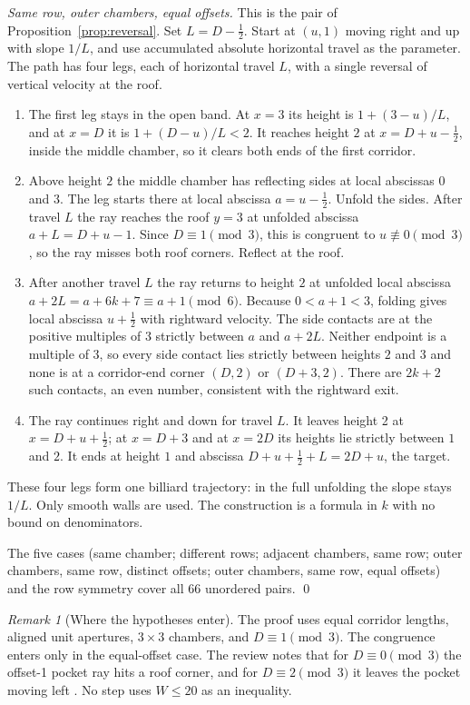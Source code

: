 \documentclass[11pt]{article}
\theoremstyle{definition}
\theoremstyle{remark}
\newtheorem{remark}{Remark}
\begin{document}
\emph{Same row, outer chambers, equal offsets.} This is the pair of
Proposition~\ref{prop:reversal}. Set $L=D-\tfrac12$. Start at $(u,1)$ moving
right and up with slope $1/L$, and use accumulated absolute horizontal travel as
the parameter. The path has four legs, each of horizontal travel $L$, with a
single reversal of vertical velocity at the roof.
\begin{enumerate}
\item The first leg stays in the open band. At $x=3$ its height is
$1+(3-u)/L$, and at $x=D$ it is $1+(D-u)/L<2$. It reaches height $2$ at
$x=D+u-\tfrac12$, inside the middle chamber, so it clears both ends of the first
corridor.
\item Above height $2$ the middle chamber has reflecting sides at local
abscissas $0$ and $3$. The leg starts there at local abscissa
$a=u-\tfrac12$. Unfold the sides. After travel $L$ the ray reaches the roof
$y=3$ at unfolded abscissa $a+L=D+u-1$. Since $D\equiv 1\pmod 3$, this is
congruent to $u\not\equiv 0\pmod 3$, so the ray misses both roof corners.
Reflect at the roof.
\item After another travel $L$ the ray returns to height $2$ at unfolded local
abscissa $a+2L=a+6k+7\equiv a+1\pmod 6$. Because $0<a+1<3$, folding gives local
abscissa $u+\tfrac12$ with rightward velocity. The side contacts are at the
positive multiples of $3$ strictly between $a$ and $a+2L$. Neither endpoint is a
multiple of $3$, so every side contact lies strictly between heights $2$ and
$3$ and none is at a corridor-end corner $(D,2)$ or $(D+3,2)$. There are
$2k+2$ such contacts, an even number, consistent with the rightward exit.
\item The ray continues right and down for travel $L$. It leaves height 2 at
$x=D+u+\tfrac12$; at $x=D+3$ and at $x=2D$ its heights lie strictly between $1$
and $2$. It ends at height $1$ and abscissa $D+u+\tfrac12+L=2D+u$, the target.
\end{enumerate}
These four legs form one billiard trajectory: in the full unfolding the slope
stays $1/L$. Only smooth walls are used. The construction is a formula in $k$
with no bound on denominators.

The five cases (same chamber; different rows; adjacent chambers, same row;
outer chambers, same row, distinct offsets; outer chambers, same row, equal
offsets) and the row symmetry cover all $66$ unordered pairs. \qed

\begin{remark}[Where the hypotheses enter]
The proof uses equal corridor lengths, aligned unit apertures, $3\times 3$
chambers, and $D\equiv 1\pmod 3$. The congruence enters only in the
equal-offset case. The review notes that for $D\equiv 0\pmod 3$ the offset-1
pocket ray hits a roof corner, and for $D\equiv 2\pmod 3$ it leaves the pocket
moving left \cite{d200}. No step uses $W\le 20$ as an inequality.
\end{remark}
\end{document}
